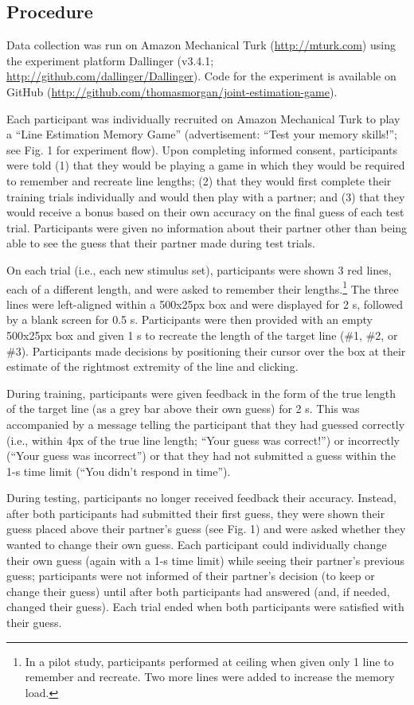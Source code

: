 \documentclass[10pt, letterpaper]{article}
\begin{document}
\subsection{Procedure}\label{procedure}

Data collection was run on Amazon Mechanical Turk
(\url{http://mturk.com}) using the experiment platform Dallinger
(v3.4.1; \url{http://github.com/dallinger/Dallinger}). Code for the
experiment is available on GitHub
(\url{http://github.com/thomasmorgan/joint-estimation-game}).

Each participant was individually recruited on Amazon Mechanical Turk to
play a ``Line Estimation Memory Game'' (advertisement: ``Test your
memory skills!''; see Fig. 1 for experiment flow). Upon completing
informed consent, participants were told (1) that they would be playing
a game in which they would be required to remember and recreate line
lengths; (2) that they would first complete their training trials
individually and would then play with a partner; and (3) that they would
receive a bonus based on their own accuracy on the final guess of each
test trial. Participants were given no information about their partner
other than being able to see the guess that their partner made during
test trials.

On each trial (i.e., each new stimulus set), participants were shown 3
red lines, each of a different length, and were asked to remember their
lengths.\footnote{In a pilot study, participants performed at ceiling when given only 1 line to remember and recreate. Two more lines were added to increase the memory load.}
The three lines were left-aligned within a 500x25px box and were
displayed for 2 s, followed by a blank screen for 0.5 s. Participants
were then provided with an empty 500x25px box and given 1 s to recreate
the length of the target line (\#1, \#2, or \#3). Participants made
decisions by positioning their cursor over the box at their estimate of
the rightmost extremity of the line and clicking.

During training, participants were given feedback in the form of the
true length of the target line (as a grey bar above their own guess) for
2 s. This was accompanied by a message telling the participant that they
had guessed correctly (i.e., within 4px of the true line length; ``Your
guess was correct!'') or incorrectly (``Your guess was incorrect'') or
that they had not submitted a guess within the 1-s time limit (``You
didn't respond in time'').

During testing, participants no longer received feedback their accuracy.
Instead, after both participants had submitted their first guess, they
were shown their guess placed above their partner's guess (see Fig. 1)
and were asked whether they wanted to change their own guess. Each
participant could individually change their own guess (again with a 1-s
time limit) while seeing their partner's previous guess; participants
were not informed of their partner's decision (to keep or change their
guess) until after both participants had answered (and, if needed,
changed their guess). Each trial ended when both participants were
satisfied with their guess.
\end{document}

